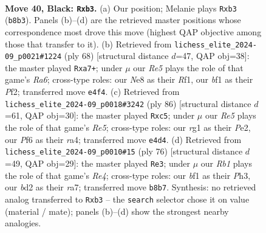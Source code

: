 \documentclass[11pt]{article}
\begin{document}
\clearpage

\begin{figure}[p]\centering
\begin{subfigure}{0.46\textwidth}\centering
\resizebox{\linewidth}{!}{%
\newchessgame
\chessboard[
  setfen={1r2n1R1/p1p1k3/2P2p2/8/4rP1p/1P6/3B3P/3K1BR1 b - - 5 40},
  showmover=false,
  pgfstyle=straightmove, color=movearrow, markmove={b8-b3}
]}
\caption{}
\end{subfigure}\hfill
\begin{subfigure}{0.46\textwidth}\centering
\resizebox{\linewidth}{!}{%
\newchessgame
\chessboard[
  setfen={3r4/p5kp/R7/5p2/4p3/1N4PP/Pb3P2/3r1RK1 w - - 0 35},
  showmover=false,
  pgfstyle=straightmove, color=movearrow, markmove={a6-a7}
]}
\caption{}
\end{subfigure}
\\[4pt]
\begin{subfigure}{0.46\textwidth}\centering
\resizebox{\linewidth}{!}{%
\newchessgame
\chessboard[
  setfen={3r4/2pb1k2/7p/2p1Rp2/r4N1P/6P1/4P3/3RK3 w - - 2 44},
  showmover=false,
  pgfstyle=straightmove, color=movearrow, markmove={e5-c5}
]}
\caption{}
\end{subfigure}\hfill
\begin{subfigure}{0.46\textwidth}\centering
\resizebox{\linewidth}{!}{%
\newchessgame
\chessboard[
  setfen={4r3/r2bN2k/3p4/6p1/2P1R2p/p6P/R1P2PP1/5K2 w - - 0 39},
  showmover=false,
  pgfstyle=straightmove, color=movearrow, markmove={e4-e3}
]}
\caption{}
\end{subfigure}
\caption{\textbf{Move 40, Black: \texttt{Rxb3}.} (a) Our position; Melanie plays \texttt{Rxb3} (\texttt{b8b3}). Panels (b)--(d) are the retrieved master positions whose correspondence most drove this move (highest QAP objective among those that transfer to it). (b) Retrieved from \texttt{lichess\_elite\_2024-09\_p0021\#1224} (ply 68) [structural distance $d$=47, QAP obj=38]: the master played \texttt{Rxa7+}; under $\mu$ our \emph{Re5} plays the role of that game's \emph{Ra6}; cross-type roles: our \emph{N}e8 as their \emph{R}f1, our \emph{b}f1 as their \emph{P}f2; transferred move \texttt{e4f4}. (c) Retrieved from \texttt{lichess\_elite\_2024-09\_p0018\#3242} (ply 86) [structural distance $d$=61, QAP obj=30]: the master played \texttt{Rxc5}; under $\mu$ our \emph{Re5} plays the role of that game's \emph{Re5}; cross-type roles: our \emph{r}g1 as their \emph{P}e2, our \emph{P}f6 as their \emph{r}a4; transferred move \texttt{e4d4}. (d) Retrieved from \texttt{lichess\_elite\_2024-09\_p0010\#15} (ply 76) [structural distance $d$=49, QAP obj=29]: the master played \texttt{Re3}; under $\mu$ our \emph{Rb1} plays the role of that game's \emph{Re4}; cross-type roles: our \emph{b}f1 as their \emph{P}h3, our \emph{b}d2 as their \emph{r}a7; transferred move \texttt{b8b7}. Synthesis: no retrieved analog transferred to \texttt{Rxb3} -- the \texttt{search} selector chose it on value (material / mate); panels (b)--(d) show the strongest nearby analogies.}
\label{fig:thought-m79}
\end{figure}
\end{document}
